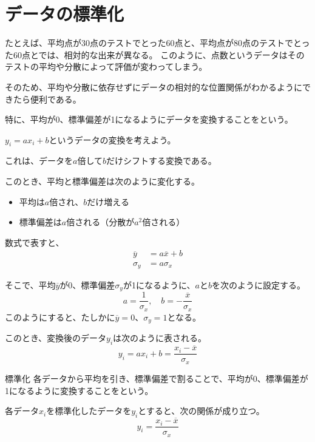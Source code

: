 \documentclass[../../../topic_statistics]{subfiles}
\begin{document}
\sectionline
\section{データの標準化}

たとえば、平均点が30点のテストでとった60点と、平均点が80点のテストでとった60点とでは、相対的な出来が異なる。
このように、点数というデータはそのテストの平均や分散によって評価が変わってしまう。

そのため、平均や分散に依存せずにデータの相対的な位置関係がわかるようにできたら便利である。

\br

特に、平均が0、標準偏差が1になるようにデータを変換することをという。

\br

$y_i = ax_i + b$というデータの変換を考えよう。

これは、データを$a$倍して$b$だけシフトする変換である。

\br

このとき、平均と標準偏差は次のように変化する。
\begin{itemize}
  \item 平均は$a$倍され、$b$だけ増える
  \item 標準偏差は$a$倍される（分散が$a^2$倍される）
\end{itemize}

数式で表すと、
\begin{align*}
  \overline{y} &= a \overline{x} + b \\
  \sigma_y &= a \sigma_x
\end{align*}

そこで、平均$\overline{y}$が0、標準偏差$\sigma_y$が1になるように、$a$と$b$を次のように設定する。
\begin{equation*}
  a = \frac{1}{\sigma_x}, \quad b = -\frac{\overline{x}}{\sigma_x}
\end{equation*}
このようにすると、たしかに$\overline{y} = 0$、$\sigma_y = 1$となる。

\br

このとき、変換後のデータ$y_i$は次のように表される。
\begin{equation*}
  y_i = ax_i + b = \frac{x_i - \overline{x}}{\sigma_x}
\end{equation*}

\begin{definition}{標準化}
  各データから平均を引き、標準偏差で割ることで、平均が0、標準偏差が1になるように変換することをという。
  
  各データ$x_i$を標準化したデータを$y_i$とすると、次の関係が成り立つ。
  \begin{equation*}
    y_i = \frac{x_i - \overline{x}}{\sigma_x}
  \end{equation*}
\end{definition}
\end{document}
